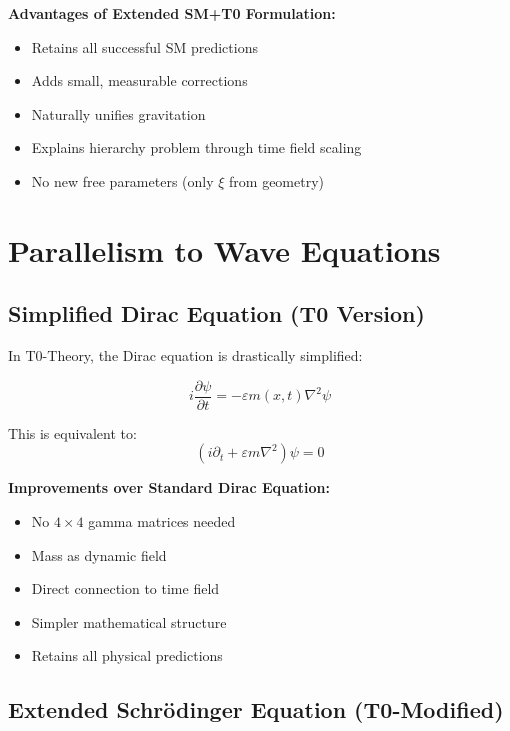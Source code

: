 \documentclass[12pt,a4paper]{article}
\begin{document}
	\textbf{Advantages of Extended SM+T0 Formulation:}
	\begin{itemize}
		\item Retains all successful SM predictions
		\item Adds small, measurable corrections
		\item Naturally unifies gravitation
		\item Explains hierarchy problem through time field scaling
		\item No new free parameters (only $\xi$ from geometry)
	\end{itemize}
	
	\section{Parallelism to Wave Equations}
	
	\subsection{Simplified Dirac Equation (T0 Version)}
	
	In T0-Theory, the Dirac equation is drastically simplified:
	
	\begin{t0box}
		\begin{equation}
			i\frac{\partial\psi}{\partial t} = -\varepsilon m(x,t) \nabla^2 \psi
		\end{equation}
		
		This is equivalent to:
		\begin{equation}
			(i\partial_t + \varepsilon m \nabla^2)\psi = 0
		\end{equation}
	\end{t0box}
	
	\textbf{Improvements over Standard Dirac Equation:}
	\begin{itemize}
		\item No $4 \times 4$ gamma matrices needed
		\item Mass as dynamic field
		\item Direct connection to time field
		\item Simpler mathematical structure
		\item Retains all physical predictions
	\end{itemize}
	
	\subsection{Extended Schrödinger Equation (T0-Modified)}
	
\end{document}
